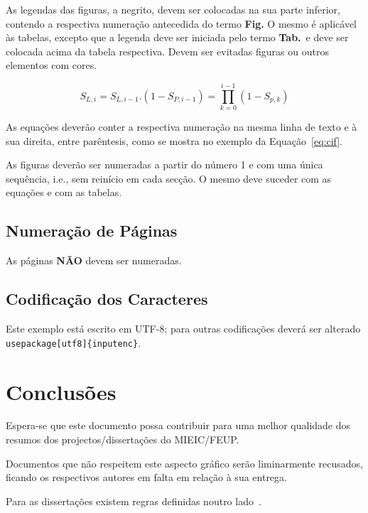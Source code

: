 \documentclass[9pt,a4paper]{extarticle}
\begin{document}
\begin{multicols}{2}
As legendas das figuras, a negrito, devem ser colocadas na sua parte inferior, contendo a respectiva numeração antecedida do termo \textbf{Fig.}
O mesmo é aplicável às tabelas, excepto que a legenda deve ser iniciada pelo termo \textbf{Tab.}\ e deve ser colocada acima da tabela respectiva.
Devem ser evitadas figuras ou outros elementos com cores.

\begin{equation}
  S_{L,i} = S_{L,i-1} . (1-S_{P,i-1}) = \prod_{k=0}^{i-1} (1-S_{p,k}) \label{eq:cif}
\end{equation}

As equações deverão conter a respectiva numeração na mesma linha de texto e à sua direita, entre parêntesis, como se mostra no exemplo da Equação~\ref{eq:cif}.

As figuras deverão ser numeradas a partir do número 1 e com uma única sequência, i.e., sem reinício em cada secção.
O mesmo deve suceder com as equações e com as tabelas.

\subsection{Numeração de Páginas}\label{sec:number}

As páginas \textbf{NÃO} devem ser numeradas.

\subsection{Codificação dos Caracteres}\label{sec:encomding}

Este exemplo está escrito em UTF-8; para outras codificações deverá
ser alterado \texttt{\\usepackage[utf8]\{inputenc\}}.


\section{Conclusões}\label{sec:conclui}

Espera-se que este documento possa contribuir para uma melhor qualidade dos resumos dos projectos/dissertações do MIEIC/FEUP.

Documentos que não respeitem este aspecto gráfico serão liminarmente recusados, ficando os respectivos autores em falta em relação à sua entrega.

Para as dissertações existem regras definidas noutro lado~\cite{kn:Mat93}.



\end{multicols}
\end{document}
